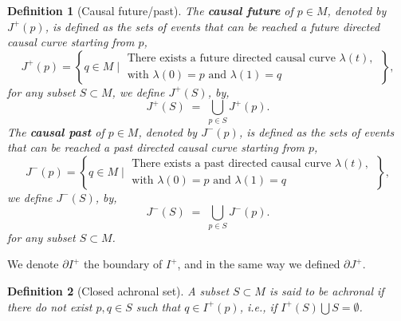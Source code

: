 \documentclass[11pt]{book}
\theoremstyle{break}
\newtheorem{definition}{Definition}
\begin{document}
\begin{definition}[Causal future/past] 
The \textbf{causal future} of $p \in M$, denoted by $J^{+}(p)$, is defined as the sets of events that can be reached a future directed causal curve starting from $p$,
\begin{equation*}
J^{+}(p) = \left\{ q \in M \; \bigg| \; \begin{array}{l} \text{There exists a future directed causal curve $\lambda(t)$,} \\ \text{with $\lambda(0)=p$ and $\lambda(1)=q$} \end{array} \; \right\},
\end{equation*}
for any subset $S \subset M$, we define $J^{+}(S)$, by,
\begin{equation*}
J^{+}(S) \; = \; \bigcup_{p \in S} J^{+}(p). 
\end{equation*}
The \textbf{causal past} of $p \in M$, denoted by $J^{-}(p)$, is defined as the sets of events that can be reached a past directed causal curve starting from $p$,
\begin{equation*}
J^{-}(p) = \left\{ q \in M \; \bigg| \; \begin{array}{l} \text{There exists a past directed causal curve $\lambda(t)$,} \\ \text{with $\lambda(0)=p$ and $\lambda(1)=q$} \end{array} \; \right\},
\end{equation*}
we define $J^{-}(S)$, by,
\begin{equation*}
J^{-}(S) \; = \; \bigcup_{p \in S} J^{-}(p). 
\end{equation*}
for any subset $S \subset M$. 
\end{definition}

We denote $\partial I^{+}$ the boundary of $I^+$, and in the same way we defined $\partial J^+$.

\begin{definition}[Closed achronal set]
A subset $S \subset M$ is said to be achronal if there do not exist $p, q \in S$ such that $q \in I^{+}(p)$, i.e., if $I^{+}(S) \bigcup S = \emptyset$. 
\end{definition}
\end{document}

